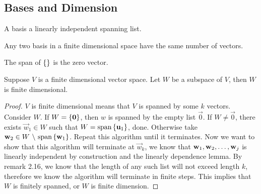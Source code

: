 \subsection{Bases and Dimension}
\begin{definition}
    A basis a linearly independent spanning list.
\end{definition}
\begin{theorem}
    Any two basis in a finite dimensional space have the same number of vectors.
\end{theorem}
\begin{remark}
    The span of $\left\{ \right\}$ is the zero vector.
\end{remark}
\begin{theorem}
    Suppose $V$ is a finite dimensional vector space. Let $W$ be a subspace of $V$, then $W$ is finite dimensional.
\end{theorem}
\begin{proof}
    $V$ is finite dimensional means that $V$ is spanned by some $k$ vectors. Consider $W$. If $W = \left\{ \mathbf 0 \right\}$, then $w$ is spanned by the empty list $\vec 0$. If $W \neq \vec 0$, there exists $\vec w_1 \in W$ such that $W = \text{span}\left\{ \mathbf u_1 \right\}$, done. Otherwise take $\vec w_2 \in W \ \backslash \  \spa \lb \vec w_1 \rb$. Repeat this algorithm until it terminates. Now we want to show that this algorithm will terminate at $\vec w_k$, we know that ${\mathbf w}_1,{\mathbf w}_2, \ldots, {\mathbf w}_{j}$ is linearly independent by construction and the linearly dependence lemma. By remark 2.16, we know that the length of any such list will not exceed length $k$, therefore we know the algorithm will terminate in finite steps. This implies that $W$ is finitely spanned, or $W$ is finite dimension.
\end{proof}

